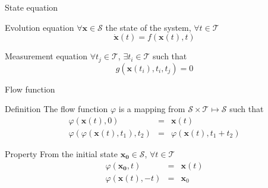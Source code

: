 \documentclass{beamer}
\begin{document}
            \begin{frame}{State equation}
                \begin{block}{Evolution equation}
                    $\forall \mathbf{x} \in \mathcal{S}$ the state of the system, $\forall t \in \mathcal{T}$
                    \begin{equation}
                        \dot{\mathbf{x}}(t) = f(\mathbf{x}(t), t)
                    \end{equation}
                \end{block}

                \begin{block}{Measurement equation}
                    $\forall t_j \in \mathcal{T}$, $\exists t_i \in \mathcal{T}$ such that
                    \begin{equation}
                        g(\mathbf{x}(t_i), t_i, t_j) = 0
                    \end{equation}
                \end{block}
            \end{frame}

            \begin{frame}{Flow function}
                \begin{block}{Definition}
                    The flow function $\varphi$ is a mapping from $\mathcal{S} \times \mathcal{T} \mapsto \mathcal{S}$ such that
                    \begin{eqnarray}
                        \varphi(\mathbf{x}(t),0) &=& \mathbf{x}(t) \\
                        \varphi(\varphi(\mathbf{x}(t),t_1),t_2) &=& \varphi(\mathbf{x}(t),t_1+t_2)
                    \end{eqnarray}
                \end{block}
                \begin{block}{Property}
                    From the initial state $\mathbf{x_0} \in \mathcal{S}$, $\forall t \in \mathcal{T}$
                    \begin{eqnarray}
                        \varphi(\mathbf{x_0},t) &=& \mathbf{x}(t) \\
                        \varphi(\mathbf{x}(t),-t) &=& \mathbf{x}_0
                    \end{eqnarray}
                \end{block}
            \end{frame}
\end{document}
